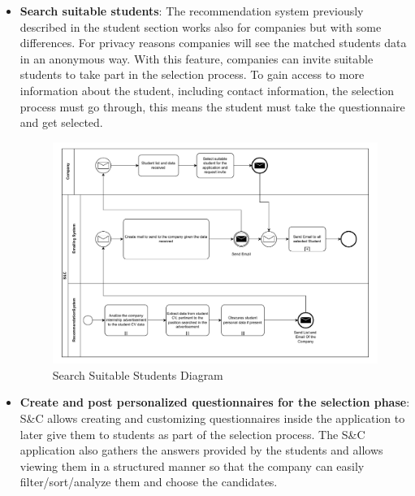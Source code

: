 \begin{itemize}
      \item \textbf{Search suitable students}: The recommendation system previously described in the student section
            works also for companies but with some differences. For privacy reasons companies will see the matched
            students data in an anonymous way. With this feature, companies can invite suitable students to take part
            in the selection process. To gain access to more information about the student, including contact
            information, the selection process must go through, this means the student must take the questionnaire and
            get selected.

            \begin{figure}[H]
                  \centering
                  \includegraphics[width=1.0\textwidth]{Images/BPMN_10.pdf}
                  \caption{Search Suitable Students Diagram}
                  \label{fig:search_suitable_students_diagram}
            \end{figure}

      \item \textbf{Create and post personalized questionnaires for the selection phase}: S\&C allows creating and
            customizing questionnaires inside the application to later give them to students as part of the selection
            process. The S\&C application also gathers the answers provided by the students and allows viewing them in
            a structured manner so that the company can easily filter/sort/analyze them and choose the candidates.


\end{itemize}
